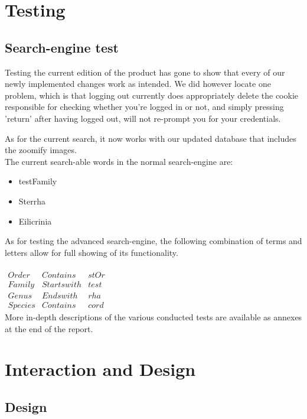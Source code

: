 \documentclass[12pt,a4paper]{article}
\begin{document}
\section{Testing}
\subsection{Search-engine test}

Testing the current edition of the product has gone to show that every of our newly implemented changes work as intended. We did however locate one problem, which is that logging out currently does appropriately delete the cookie responsible for checking whether you're logged in or not, and simply pressing 'return' after having logged out, will not re-prompt you for your credentials.

As for the current search, it now works with our updated database that includes the zoomify images.\\
The current search-able words in the normal search-engine are:

\begin{itemize}
	\item testFamily
	\item Sterrha
	\item Eilicrinia
\end{itemize}

As for testing the advanced search-engine, the following combination of terms and letters allow for full showing of its functionality.
\\\\
$
\begin{array}{c|c|c}
Order & Contains & stOr \\ 
Family & Starts with & test \\ 
Genus & Ends with & rha \\ 
Species & Contains & cord
\end{array}
$
\\

More in-depth descriptions of the various conducted tests are available as annexes at the end of the report.

\newpage
\section{Interaction and Design}
\subsection{Design}
\end{document}
